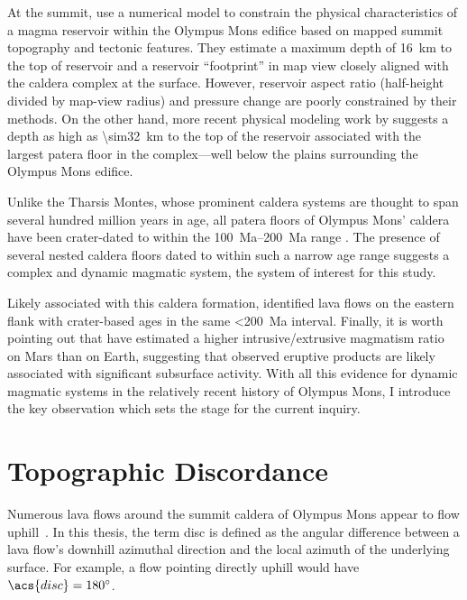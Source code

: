 At the summit, \textcite{zuber_caldera_1992} use a numerical model to constrain the physical characteristics of a magma reservoir within the Olympus Mons edifice based on mapped summit topography and tectonic features. They estimate a maximum depth of \qty{16}{km} to the top of reservoir and a reservoir ``footprint'' in map view closely aligned with the caldera complex at the surface. However, reservoir aspect ratio (half-height divided by map-view radius) and pressure change are poorly constrained by their methods. On the other hand, more recent physical modeling work by \textcite{beddingfield_formation_2011} suggests a depth as high as \qty{\sim32}{km} to the top of the reservoir associated with the largest patera floor in the complex---well below the plains surrounding the Olympus Mons edifice.

Unlike the Tharsis Montes, whose prominent caldera systems are thought to span several hundred million years in age, all patera floors of Olympus Mons' caldera have been crater-dated to within the \qtyrange{100}{200}{Ma} range \parencite{neukum_recent_2004}. The presence of several nested caldera floors dated to within such a narrow age range suggests a complex and dynamic magmatic system, the system of interest for this study.

Likely associated with this caldera formation, \textcite{basilevsky_geologically_2006} identified lava flows on the eastern flank with crater-based ages in the same \qty{<200}{Ma} interval. Finally, it is worth pointing out that \textcite[][and others]{black_eruptibility_2016} have estimated a higher intrusive/extrusive magmatism ratio on Mars than on Earth, suggesting that observed eruptive products are likely associated with significant subsurface activity. With all this evidence for dynamic magmatic systems in the relatively recent history of Olympus Mons, I introduce the key observation which sets the stage for the current inquiry.  

\section{Topographic Discordance}\label{sec:discordance}

Numerous lava flows around the summit caldera of Olympus Mons appear to flow uphill~\parencite[Figure~\ref{fig:uphill-flows}; after][]{mouginis-mark_late-stage_2019}. In this thesis, the term \ac{disc} is defined as the angular difference between a lava flow's downhill azimuthal direction and the local azimuth of the underlying surface. For example, a flow pointing directly uphill would have $\acs{disc}=\ang{180}$. 

